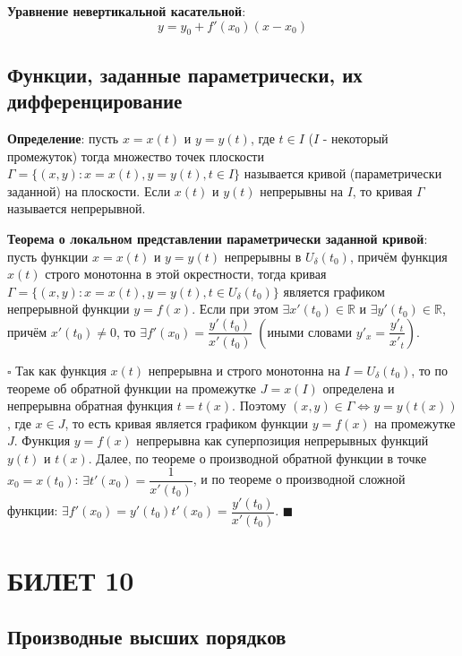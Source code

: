 \documentclass[12pt, a4paper, reqno]{article}
\begin{document}
    \textbf{Уравнение невертикальной касательной}:
    \begin{equation*}
        y = y_0 + f'(x_0)(x - x_0)
    \end{equation*}

\subsection{Функции, заданные параметрически, их дифференцирование}

    \textbf{Определение}: пусть $x = x(t)$ и $y = y(t)$, где $t\in I$ ($I$ - некоторый промежуток)
    тогда множество точек плоскости $\Gamma = \{(x, y): x = x(t), y = y(t), t\in I\}$ называется
    кривой (параметрически заданной) на плоскости. Если $x(t)$ и $y(t)$ непрерывны на $I$, то кривая
    $\Gamma$ называется непрерывной.

    \textbf{Теорема о локальном представлении параметрически заданной кривой}: пусть функции
    $x = x(t)$ и $y = y(t)$ непрерывны в $U_{\delta}(t_0)$, причём функция $x(t)$ строго монотонна в
    этой окрестности, тогда кривая $\Gamma = \{(x, y): x = x(t), y = y(t), t\in U_{\delta}(t_0)\}$
    является графиком непрерывной функции $y = f(x)$. Если при этом $\exists x'(t_0)\in\mathbb{R}$ и
    $\exists y'(t_0)\in\mathbb{R}$, причём $x'(t_0)\neq 0$, то $\exists f'(x_0) =
    \dfrac{y'(t_0)}{x'(t_0)}$ $\left(\text{иными словами }y'_x = \dfrac{y'_t}{x'_t}\right)$.

    $\square$ Так как функция $x(t)$ непрерывна и строго монотонна на $I = U_{\delta}(t_0)$, то по
    теореме об обратной функции на промежутке $J = x(I)$ определена и непрерывна обратная функция
    $t = t(x)$. Поэтому $(x, y)\in\Gamma \iff y = y(t(x))$, где $x\in J$, то есть кривая является
    графиком функции $y = f(x)$ на промежутке $J$. Функция $y = f(x)$ непрерывна как суперпозиция
    непрерывных функций $y(t)$ и $t(x)$. Далее, по теореме о производной обратной функции в точке
    $x_0 = x(t_0)$: $\exists t'(x_0) = \dfrac{1}{x'(t_0)}$, и по теореме о производной сложной
    функции: $\exists f'(x_0) = y'(t_0)t'(x_0) = \dfrac{y'(t_0)}{x'(t_0)}$. $\blacksquare$

\newpage
\section{БИЛЕТ 10}

\subsection{Производные высших порядков}
\end{document}
